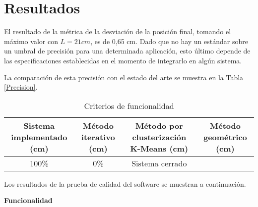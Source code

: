 \section{Resultados}

El resultado de la métrica de la desviación de la posición final, tomando el máximo valor con $L = 21 cm$, es de 0,65 cm. Dado que no hay un estándar sobre un umbral de precisión para una determinada aplicación, esto último depende de las especificaciones establecidas en el momento de integrarlo en algún sistema.

La comparación de esta precisión con el estado del arte se muestra en la Tabla \ref{Precision}.

\begin{table}[ht]
	\centering
	\begin{tabular}{|c|c|c|c|}
		\hline
		\textbf{Sistema implementado (cm)} & \textbf{Método iterativo (cm)} & \textbf{Método por clusterización K-Means (cm)} & \textbf{Método geométrico (cm)} \\
		\hline
		100\% & 0\% & Sistema cerrado \\
		\hline
	\end{tabular}
	\caption{Criterios de funcionalidad}
	\label{tab:Precision}
\end{table}

Los resultados de la prueba de calidad del software se muestran a continuación.

\textbf{Funcionalidad}

